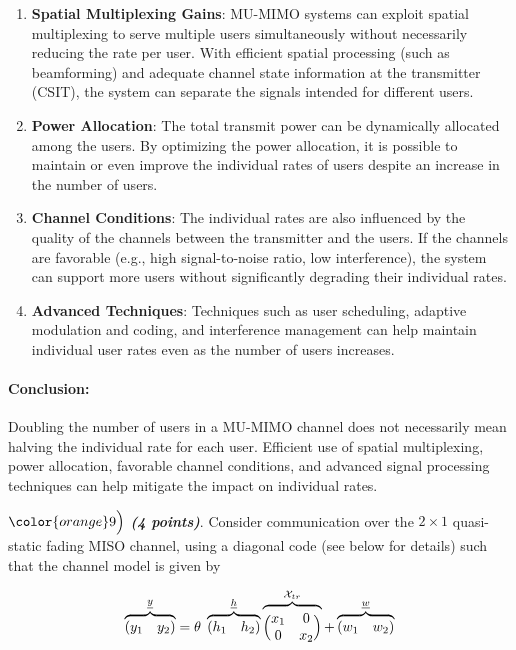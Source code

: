 \documentclass[11pt]{article}
\begin{document}
\begin{enumerate}
\def\labelenumi{\arabic{enumi}.}
\item
  \textbf{Spatial Multiplexing Gains}: MU-MIMO systems can exploit
  spatial multiplexing to serve multiple users simultaneously without
  necessarily reducing the rate per user. With efficient spatial
  processing (such as beamforming) and adequate channel state
  information at the transmitter (CSIT), the system can separate the
  signals intended for different users.
\item
  \textbf{Power Allocation}: The total transmit power can be dynamically
  allocated among the users. By optimizing the power allocation, it is
  possible to maintain or even improve the individual rates of users
  despite an increase in the number of users.
\item
  \textbf{Channel Conditions}: The individual rates are also influenced
  by the quality of the channels between the transmitter and the users.
  If the channels are favorable (e.g., high signal-to-noise ratio, low
  interference), the system can support more users without significantly
  degrading their individual rates.
\item
  \textbf{Advanced Techniques}: Techniques such as user scheduling,
  adaptive modulation and coding, and interference management can help
  maintain individual user rates even as the number of users increases.
\end{enumerate}

\paragraph{Conclusion:}\label{conclusion}

Doubling the number of users in a MU-MIMO channel does not necessarily
mean halving the individual rate for each user. Efficient use of spatial
multiplexing, power allocation, favorable channel conditions, and
advanced signal processing techniques can help mitigate the impact on
individual rates.

    \(\color{orange}9\Bigl)\) \textbf{\emph{(4 points)}}. Consider
communication over the \(2 \times 1\) quasi-static fading MISO channel,
using a diagonal code (see below for details) such that the channel
model is given by

\[
\overbrace{(y_1 \quad y_2)}^{\underline{y}} = \theta \; \overbrace{(h_1 \quad h_2)}^{\underline{h}} \overbrace{\Bigl(\begin{matrix} x_1&0 \\ 0&x_2 \end{matrix} \Bigr)}^{\mathcal{X}_{tr}} + \overbrace{(w_1 \quad w_2)}^{\underline{w}}
\]
\end{document}
